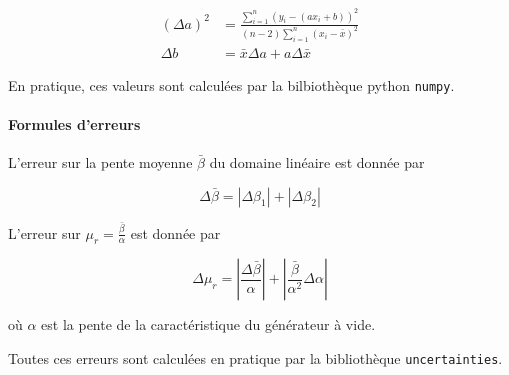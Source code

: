 \begin{equation}
    \label{eq:erreur:fit}
    \begin{aligned}
        (\Delta a)^2 &= \frac{\sum_{i=1}^{n}(y_i - (a x_i + b))^2}{(n-2) \sum_{i=1}^{n}(x_i - \bar{x})^2}\\
        \Delta b &= \bar{x} \Delta a + a \Delta \bar{x}
    \end{aligned}
\end{equation}

En pratique, ces valeurs sont calculées par la bilbiothèque python \texttt{numpy}.

\paragraph*{Formules d'erreurs}
L'erreur sur la pente moyenne \(\bar{\beta}\) du domaine linéaire est donnée par

\begin{equation}
    \Delta \bar{\beta} = \left|\Delta \beta_1\right| + \left|\Delta \beta_2\right|
\end{equation}

L'erreur sur \(\mu_r = \frac{\bar{\beta}}{\alpha}\) est donnée par

\begin{equation}
    \Delta\mu_r = \left|\frac{\Delta\bar{\beta}}{\alpha}\right| + \left|\frac{\bar{\beta}}{\alpha^2} \Delta\alpha\right|
\end{equation}

où \(\alpha\) est la pente de la caractéristique du générateur à vide.

Toutes ces erreurs sont calculées en pratique par la bibliothèque \texttt{uncertainties}.
